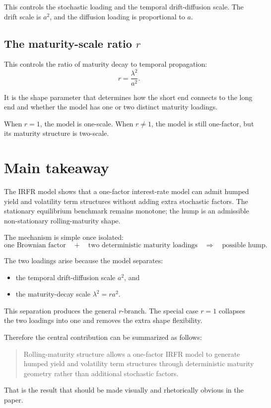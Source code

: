 \documentclass[11pt]{article}
\theoremstyle{plainbreak}
\begin{document}
This controls the stochastic loading and the temporal drift-diffusion scale. The drift scale is \(a^2\), and the diffusion loading is proportional to \(a\).

\subsection*{The maturity-scale ratio \texorpdfstring{\(r\)}{r}}

This controls the ratio of maturity decay to temporal propagation:
\[
r=\frac{\lambda^2}{a^2}.
\]

It is the shape parameter that determines how the short end connects to the long end and whether the model has one or two distinct maturity loadings.

When \(r=1\), the model is one-scale. When \(r\neq 1\), the model is still one-factor, but its maturity structure is two-scale.

\section{Main takeaway}

The IRFR model shows that a one-factor interest-rate model can admit humped yield and volatility term structures without adding extra stochastic factors. The stationary equilibrium benchmark remains monotone; the hump is an admissible non-stationary rolling-maturity shape.

The mechanism is simple once isolated:
\[
\text{one Brownian factor}
\quad + \quad
\text{two deterministic maturity loadings}
\quad \Rightarrow \quad
\text{possible hump}.
\]

The two loadings arise because the model separates:
\begin{itemize}
    \item the temporal drift-diffusion scale \(a^2\), and
    \item the maturity-decay scale \(\lambda^2=ra^2\).
\end{itemize}

This separation produces the general \(r\)-branch. The special case \(r=1\) collapses the two loadings into one and removes the extra shape flexibility.

Therefore the central contribution can be summarized as follows:
\begin{quote}
Rolling-maturity structure allows a one-factor IRFR model to generate humped yield and volatility term structures through deterministic maturity geometry rather than additional stochastic factors.
\end{quote}

That is the result that should be made visually and rhetorically obvious in the paper.
\end{document}
